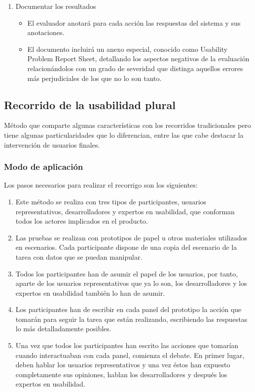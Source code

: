 \begin{enumerate}
\begin{itemize}
	\end{itemize}
	\item Documentar los resultados
	\begin{itemize}
	    \item El evaluador anotará para cada acción las respuestas del sistema y sus anotaciones.
	    \item El documento incluirá un anexo especial, conocido como Usability Problem Report Sheet, detallando los aspectos negativos de la evaluación relacionándolos con un grado de severidad que distinga aquellos errores más perjudiciales de los que no lo son tanto. 
	\end{itemize}
\end{enumerate}

\subsection{Recorrido de la usabilidad plural}
Método que comparte algunas características con los recorridos tradicionales pero tiene algunas particularidades que lo diferencian, entre las que cabe destacar la intervención de usuarios finales.
\subsubsection{Modo de aplicación}
Los pasos necesarios para realizar el recorrigo son los siguientes:
\begin{enumerate}
    \item Este método se realiza con tres tipos de participantes, usuarios representativos, desarrolladores y expertos en usabilidad, que conforman todos los actores implicados en el producto.
    \item Las pruebas se realizan con prototipos de papel u otros materiales utilizados en escenarios. Cada participante dispone de una copia del escenario de la tarea con datos que se puedan manipular.
    \item Todos los participantes han de asumir el papel de los usuarios, por tanto, aparte de los usuarios representativos que ya lo son, los desarrolladores y los expertos en usabilidad también lo han de asumir.
    \item Los participantes han de escribir en cada panel del prototipo la acción que tomarán para seguir la tarea que están realizando, escribiendo las respuestas lo más detalladamente posibles.
    \item Una vez que todos los participantes han escrito las acciones que tomarían cuando interactuaban con cada panel, comienza el debate. En primer lugar, deben hablar los usuarios representativos y una vez éstos han expuesto completamente sus opiniones, hablan los desarrolladores y después los expertos en usabilidad.
\end{enumerate}


